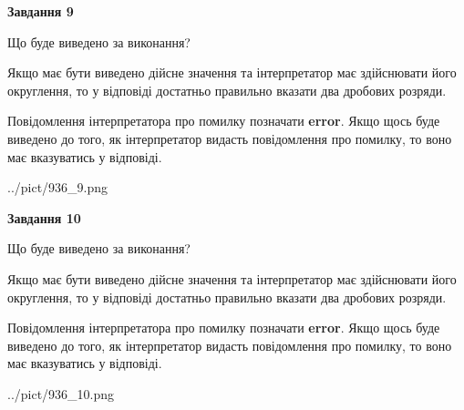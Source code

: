 \documentclass[12pt, ukrainian]{article}
\begin{document}
{\begin {Large}
{\begin {center}\textbf{Завдання 9}\end {center}}\par
Що буде виведено за виконання? \par

Якщо має бути виведено дійсне значення та інтерпретатор має здійснювати його округлення, 
то у відповіді достатньо правильно вказати два дробових розряди.

Повідомлення інтерпретатора про помилку позначати \textbf{error}.
Якщо щось буде виведено до того, як інтерпретатор видасть повідомлення про помилку, 
то воно має вказуватись у відповіді. \par

\begin{center}
	{../pict/936_9.png}
\end{center}
\newpage

{\begin {center}\textbf{Завдання 10}\end {center}}\par
Що буде виведено за виконання? \par

Якщо має бути виведено дійсне значення та інтерпретатор має здійснювати його округлення, 
то у відповіді достатньо правильно вказати два дробових розряди.

Повідомлення інтерпретатора про помилку позначати \textbf{error}.
Якщо щось буде виведено до того, як інтерпретатор видасть повідомлення про помилку, 
то воно має вказуватись у відповіді. \par

\begin{center}
	{../pict/936_10.png}
\end{center}
\newpage

\end {Large}}
\end{document}
